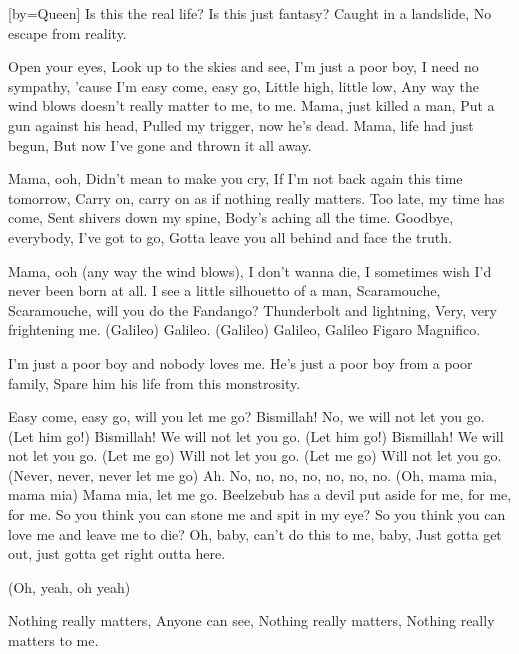 [by={Queen}]
\beginverse\singlespacing
Is this the real life?
Is this just fantasy?
Caught in a landslide,
No escape from reality.

Open your eyes,
Look up to the skies and see,
I'm just a poor boy, I need no sympathy,
'cause I'm easy come, easy go,
Little high, little low,
Any way the wind blows doesn't really matter to me, to me.
\endverse
\beginverse\singlespacing
Mama, just killed a man,
Put a gun against his head,
Pulled my trigger, now he's dead.
Mama, life had just begun,
But now I've gone and thrown it all away.

Mama, ooh,
Didn't mean to make you cry,
If I'm not back again this time tomorrow,
Carry on, carry on as if nothing really matters.
\endverse
\beginverse\singlespacing
Too late, my time has come,
Sent shivers down my spine,
Body's aching all the time.
Goodbye, everybody, I've got to go,
Gotta leave you all behind and face the truth.

Mama, ooh (any way the wind blows),
I don't wanna die,
I sometimes wish I'd never been born at all.
\endverse
\beginverse\singlespacing
I see a little silhouetto of a man,
Scaramouche, Scaramouche, will you do the Fandango?
Thunderbolt and lightning,
Very, very frightening me.
(Galileo) Galileo.
(Galileo) Galileo,
Galileo Figaro
Magnifico.

I'm just a poor boy and nobody loves me.
He's just a poor boy from a poor family,
Spare him his life from this monstrosity.

Easy come, easy go, will you let me go?
Bismillah! No, we will not let you go.
(Let him go!) Bismillah! We will not let you go.
(Let him go!) Bismillah! We will not let you go.
(Let me go) Will not let you go.
(Let me go) Will not let you go.
(Never, never, never let me go) Ah.
No, no, no, no, no, no, no.
(Oh, mama mia, mama mia) Mama mia, let me go.
Beelzebub has a devil put aside for me, for me, for me.
\endverse
\beginverse\singlespacing
So you think you can stone me and spit in my eye?
So you think you can love me and leave me to die?
Oh, baby, can't do this to me, baby,
Just gotta get out, just gotta get right outta here.

(Oh, yeah, oh yeah)

Nothing really matters,
Anyone can see,
Nothing really matters,
Nothing really matters to me.
\endverse
\endsong
